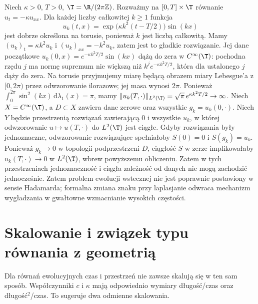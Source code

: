 \begin{kontrprzyklad}
\label{ex:backward-heat}
Niech $\kappa>0$, $T>0$, $\T=\R/(2\pi\mathbb Z)$.
Rozważmy na $[0,T]\times\T$ równanie
$u_t=-\kappa u_{xx}$. Dla każdej liczby całkowitej $k\geq1$
funkcja
\[
 u_k(t,x)=\exp\!\bigl(\kappa k^2(t-T/2)\bigr)\sin(kx)
\]
jest dobrze określona na torusie, ponieważ $k$ jest liczbą całkowitą.
Mamy $(u_k)_t=\kappa k^2u_k$ i $(u_k)_{xx}=-k^2u_k$, zatem
jest to gładkie rozwiązanie. Jej dane początkowe
$u_k(0,x)=e^{-\kappa k^2T/2}\sin(kx)$ dążą do zera
w $C^\infty(\T)$: pochodna rzędu $j$ ma normę supremum
nie większą niż $k^je^{-\kappa k^2T/2}$, która dla ustalonego
$j$ dąży do zera. Na torusie przyjmujemy miarę będącą obrazem
miary Lebesgue'a z $[0,2\pi)$ przez odwzorowanie ilorazowe;
jej masa wynosi $2\pi$. Ponieważ
$\int_0^{2\pi}\sin^2(kx)\,\mathrm d\lambda_1(x)=\pi$,
mamy $\|u_k(T,\cdot)\|_{L^2(\T)}
=\sqrt\pi\,e^{\kappa k^2T/2}\to\infty$.
Niech $X=C^\infty(\T)$, a $D\subset X$ zawiera dane zerowe
oraz wszystkie $g_k=u_k(0,\cdot)$. Niech $Y$ będzie przestrzenią
rozwiązań zawierającą $0$ i wszystkie $u_k$, w której
odwzorowanie $u\mapsto u(T,\cdot)$ do $L^2(\T)$ jest ciągłe.
Gdyby rozwiązania były jednoznaczne, odwzorowanie rozwiązujące
spełniałoby $S(0)=0$ i $S(g_k)=u_k$. Ponieważ $g_k\to0$
w topologii podprzestrzeni $D$, ciągłość $S$ w zerze
implikowałaby $u_k(T,\cdot)\to0$ w $L^2(\T)$, wbrew
powyższemu obliczeniu. Zatem w tych przestrzeniach
jednoznaczność i ciągła zależność od danych nie mogą
zachodzić jednocześnie. Zatem problem ewolucji wstecznej
nie jest poprawnie postawiony w sensie Hadamarda;
formalna zmiana znaku przy laplasjanie odwraca mechanizm
wygładzania w gwałtowne wzmacnianie wysokich częstości.
\end{kontrprzyklad}

\section{Skalowanie i związek typu równania z geometrią}
\label{sec:pde-scaling}

Dla równań ewolucyjnych czas i przestrzeń nie zawsze
skalują się w ten sam sposób. Współczynniki $c$ i $\kappa$
mają odpowiednio wymiary długość/czas oraz
długość$^2$/czas. To sugeruje dwa odmienne skalowania.

